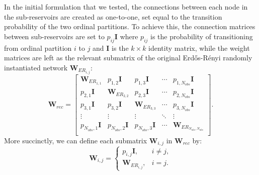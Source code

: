 In the initial formulation that we tested, the connections between each node in the sub-reservoirs are created as one-to-one, set equal to the transition probability of the two ordinal partitions. To achieve this, the connection matrices between sub-reservoirs are set to $p_{ij}\mathbf{I}$ where $p_{ij}$ is the probability of transitioning from ordinal partition $i$ to $j$ and $\mathbf{I}$ is the $k\times k$ identity matrix, while the weight matrices are left as the relevant submatrix of the original Erd\H{o}s-R\'enyi randomly instantiated network $\mathbf{W}_{ER_{i,j}}$:
\[
    \mathbf{W}_{rec} = 
    \begin{bmatrix}
    \mathbf{W}_{ER_{1,1}} & p_{1,2}\mathbf{I} & p_{1,3}\mathbf{I} & \cdots & p_{1,N_{obs}}\mathbf{I} \\
    p_{2,1}\mathbf{I} & \mathbf{W}_{ER_{2,2}} & p_{2,3}\mathbf{I} & \cdots & p_{2,N_{obs}}\mathbf{I} \\
    p_{3,1}\mathbf{I} & p_{3,2}\mathbf{I} & \mathbf{W}_{ER_{3,3}} & \cdots & p_{3,N_{obs}}\mathbf{I} \\
    \vdots & \vdots & \vdots & \ddots & \vdots \\
    p_{N_{obs},1}\mathbf{I} & p_{N_{obs},2}\mathbf{I} & p_{N_{obs},3}\mathbf{I} & \cdots & \mathbf{W}_{ER_{N_{obs},N_{obs}}} \\
    \end{bmatrix}.
\]
More succinctly, we can define each submatrix $\mathbf{W}_{i,j}$ in $\mathbf{W}_{rec}$ by:
\[
\mathbf{W}_{i,j} =
\begin{cases}
p_{i,j}\mathbf{I} , & i \neq j, \\
\mathbf{W}_{ER_{i,j}}, & i = j.
\end{cases}
\]
    

